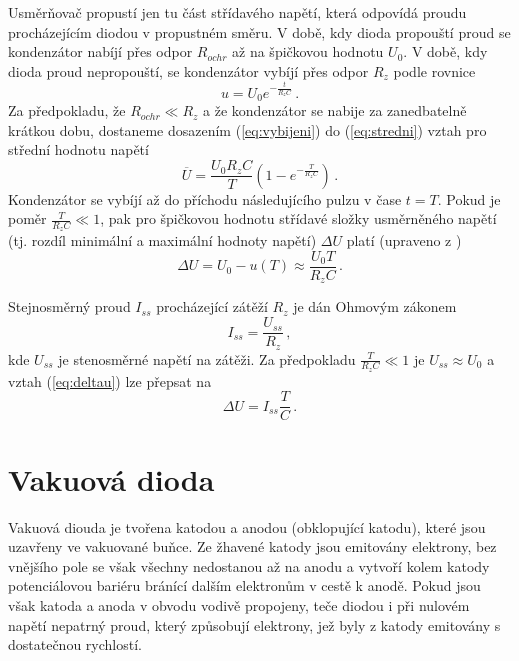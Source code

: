\documentclass{../concepts/prepareprotokol} %
\begin{document}
Usměrňovač propustí jen tu část střídavého napětí, která odpovídá proudu procházejícím diodou v propustném směru. V době, kdy dioda propouští proud se kondenzátor nabíjí přes odpor $R_{ochr}$ až na špičkovou hodnotu $U_0$. V době, kdy dioda proud nepropouští, se kondenzátor vybíjí přes odpor $R_z$ podle rovnice
\begin{equation} \label{eq:vybijeni}
    u = U_0 e^{-\frac{t}{R_z C}} \, .
\end{equation}
Za předpokladu, že $R_{ochr} \ll R_z$ a že kondenzátor se nabije za zanedbatelně krátkou dobu, dostaneme dosazením (\ref{eq:vybijeni}) do (\ref{eq:stredni}) vztah pro střední hodnotu napětí
\begin{equation} \label{eq:filtr}
    \overline{U} = \frac{U_0 R_z C}{T} \left( 1-e^{-\frac{T}{R_z C}} \right) \, .
\end{equation}
Kondenzátor se vybíjí až do příchodu následujícího pulzu v čase $t=T$. Pokud je poměr $\frac{T}{R_z C} \ll 1$, pak pro špičkovou hodnotu střídavé složky usměrněného napětí (tj. rozdíl minimální a maximální hodnoty napětí) $\Delta U$ platí (upraveno z \cite{studijni})
\begin{equation} \label{eq:deltau}
    \Delta U = U_0 - u(T) \approx \frac{U_0 T}{R_z C} \, .
\end{equation}

Stejnosměrný proud $I_{ss}$ procházející zátěží $R_z$ je dán Ohmovým zákonem \cite{studijni}
\begin{equation} \label{eq:ohm}
    I_{ss} = \frac{U_{ss}}{R_z} \, ,
\end{equation}
kde $U_{ss}$ je stenosměrné napětí na zátěži. Za předpokladu $\frac{T}{R_z C} \ll 1$ je $U_{ss} \approx U_0$ a vztah (\ref{eq:deltau}) lze přepsat na
\begin{equation} \label{eq:deltau2}
    \Delta U = I_{ss} \frac{T}{C} \, .
\end{equation}

\section{Vakuová dioda}

Vakuová diouda je tvořena katodou a anodou (obklopující katodu), které jsou uzavřeny ve vakuované buňce. \cite{diody} Ze žhavené katody jsou emitovány elektrony, bez vnějšího pole se však všechny nedostanou až na anodu a vytvoří kolem katody potenciálovou bariéru bránící dalším elektronům v cestě k anodě. Pokud jsou však katoda a anoda v obvodu vodivě propojeny, teče diodou i při nulovém napětí nepatrný proud, který způsobují elektrony, jež byly z katody emitovány s dostatečnou rychlostí. 
\end{document}
